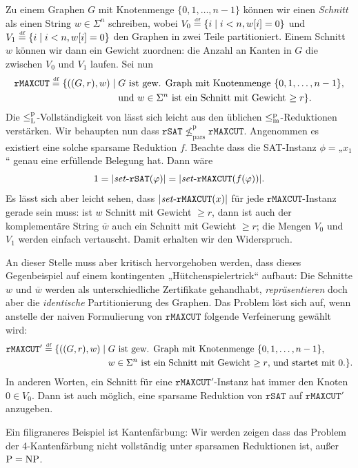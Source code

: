 Zu einem Graphen $G$ mit Knotenmenge $\{0,1,\dots, n-1\}$ können wir einen \emph{Schnitt} als einen String $w\in\Sigma^n$ schreiben, wobei $V_0 \stackrel{\text{{\normalfont\tiny df}}}{=} \{ i \mid i<n, w[i]=0\}$ und $V_1 \stackrel{\text{{\normalfont\tiny df}}}{=} \{ i \mid i<n, w[i]=0\}$ den Graphen in zwei Teile partitioniert. Einem Schnitt $w$ können wir dann ein Gewicht zuordnen: die Anzahl an Kanten in $G$ die zwischen $V_0$ und $V_1$ laufen.
Sei nun
\[ \begin{split} \mathtt{rMAXCUT} \stackrel{\text{{\normalfont\tiny df}}}{=} \{ ((G, r), w) \mid {}&\text{$G$ ist gew. Graph mit Knotenmenge $\{0,1,\dots,n-1\}$,} \\ &\text{und $w\in\Sigma^n$ ist ein Schnitt mit Gewicht $\geq r$} \}.\end{split} \]
 Die $\leq_\mathrm{L}^\mathrm{p}$-Vollständigkeit von lässt sich leicht aus den üblichen $\leq_\mathrm{m}^\mathrm{p}$-Reduktionen verstärken.
Wir behaupten nun dass $\mathtt{rSAT} \not\leq_\mathrm{pars}^\mathrm p \mathtt{rMAXCUT}$. Angenommen es existiert eine solche sparsame Reduktion $f$. Beachte dass die SAT-Instanz $\phi={}$„$x_1$“ genau eine erfüllende Belegung hat. Dann wäre
\[ 1=|\mathit{set}\text{-}{}\mathtt{rSAT}(\varphi)|=|\mathit{set}\text{-}{}\mathtt{rMAXCUT}(f(\varphi))|. \]
Es lässt sich aber leicht sehen, dass $|\mathit{set}\text{-}{}\mathtt{rMAXCUT}(x)|$ für jede $\mathtt{rMAXCUT}$-Instanz gerade sein muss: ist $w$ Schnitt mit Gewicht $\geq r$, dann ist auch der komplementäre String $\overline{w}$ auch ein Schnitt mit Gewicht $\geq r$; die Mengen $V_0$ und $V_1$ werden einfach vertauscht.
Damit erhalten wir den Widerspruch.

An dieser Stelle muss aber kritisch hervorgehoben werden, dass dieses Gegenbeispiel auf einem kontingenten „Hütchenspielertrick“ aufbaut: Die Schnitte $w$ und $\overline{w}$ werden als unterschiedliche Zertifikate gehandhabt, \emph{repräsentieren} doch aber die \emph{identische} Partitionierung des Graphen.
Das Problem löst sich auf, wenn anstelle der naiven Formulierung von $\mathtt{rMAXCUT}$ folgende Verfeinerung gewählt wird:
\[ \begin{split} \mathtt{rMAXCUT'} \stackrel{\text{{\normalfont\tiny df}}}{=} \{ ((G, r), w) \mid {}&\text{$G$ ist gew. Graph mit Knotenmenge $\{0,1,\dots,n-1\}$,} \\ &\text{$w\in\Sigma^n$ ist ein Schnitt mit Gewicht $\geq r$, und startet mit $0$.} \}.\end{split} \]
In anderen Worten, ein Schnitt für eine $\mathtt{rMAXCUT'}$-Instanz hat immer den Knoten $0\in V_0$.
Dann ist auch möglich, eine sparsame Reduktion von $\mathtt{rSAT}$ auf $\mathtt{rMAXCUT'}$ anzugeben.

Ein filigraneres Beispiel ist Kantenfärbung:  Wir werden zeigen dass das Problem der 4-Kantenfärbung nicht vollständig unter sparsamen Reduktionen ist, außer $\mathrm{P}=\mathrm{NP}$.

